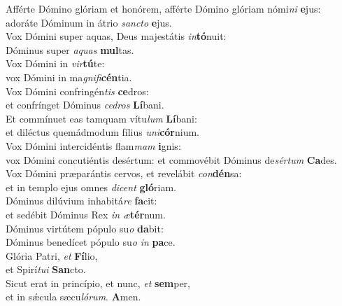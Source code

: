 \evenverse Afférte Dómino glóriam et honórem, afférte Dómino glóriam nómi\textit{ni} \textbf{e}jus:~\*\\
\evenverse adoráte Dóminum in átrio \textit{san}\textit{cto} \textbf{e}jus.\\
\oddverse Vox Dómini super aquas, Deus majestátis \textit{in}\textbf{tó}nuit:~\*\\
\oddverse Dóminus super \textit{a}\textit{quas} \textbf{mul}tas.\\
\evenverse Vox Dómini in \textit{vir}\textbf{tú}te:~\*\\
\evenverse vox Dómini in ma\textit{gni}\textit{fi}\textbf{cén}tia.\\
\oddverse Vox Dómini confringén\textit{tis} \textbf{ce}dros:~\*\\
\oddverse et confrínget Dóminus \textit{ce}\textit{dros} \textbf{Lí}bani.\\
\evenverse Et commínuet eas tamquam vítu\textit{lum} \textbf{Lí}bani:~\*\\
\evenverse et diléctus quemádmodum fílius \textit{u}\textit{ni}\textbf{cór}nium.\\
\oddverse Vox Dómini intercidéntis flam\textit{mam} \textbf{i}gnis:~\*\\
\oddverse vox Dómini concutiéntis desértum: et commovébit Dóminus de\textit{sér}\textit{tum} \textbf{Ca}des.\\
\evenverse Vox Dómini præparántis cervos, et revelábit \textit{con}\textbf{dén}sa:~\*\\
\evenverse et in templo ejus omnes \textit{di}\textit{cent} \textbf{gló}riam.\\
\oddverse Dóminus dilúvium inhabitá\textit{re} \textbf{fa}cit:~\*\\
\oddverse et sedébit Dóminus Rex \textit{in} \textit{æ}\textbf{tér}num.\\
\evenverse Dóminus virtútem pópulo su\textit{o} \textbf{da}bit:~\*\\
\evenverse Dóminus benedícet pópulo su\textit{o} \textit{in} \textbf{pa}ce.\\
\oddverse Glória Patri, \textit{et} \textbf{Fí}lio,~\*\\
\oddverse et Spirí\textit{tu}\textit{i} \textbf{San}cto.\\
\evenverse Sicut erat in princípio, et nunc, \textit{et} \textbf{sem}per,~\*\\
\evenverse et in sǽcula sæcu\textit{ló}\textit{rum}. \textbf{A}men.\\
